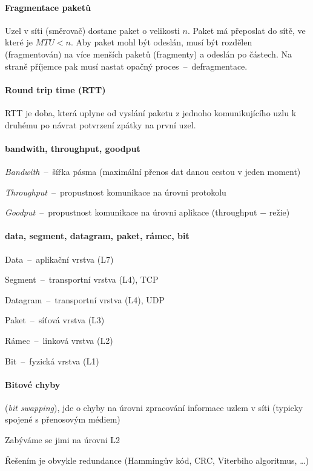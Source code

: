 \paragraph*{Fragmentace paketů} Uzel v síti (směrovač) dostane paket o velikosti $n$. Paket má přeposlat do sítě, ve které je $MTU < n$. Aby paket mohl být odeslán, musí být rozdělen (fragmentován) na více menších paketů (fragmenty) a odeslán po částech. Na straně příjemce pak musí nastat opačný proces~--~defragmentace.

\paragraph*{Round trip time (RTT)} RTT je doba, která uplyne od vyslání paketu z jednoho komunikujícího uzlu k druhému po návrat potvrzení zpátky na první uzel.

\paragraph*{bandwith, throughput, goodput} \begin{compactitem}
    \item \textit{Bandwith}~--~šířka pásma (maximální přenos dat danou cestou v jeden moment)
    \item \textit{Throughput}~--~propustnost komunikace na úrovni protokolu
    \item \textit{Goodput}~--~propustnost komunikace na úrovni aplikace (throughput $-$ režie)
\end{compactitem}

\paragraph*{data, segment, datagram, paket, rámec, bit} \begin{compactitem}
    \item Data~--~aplikační vrstva (L7)
    \item Segment~--~transportní vrstva (L4), TCP
    \item Datagram~--~transportní vrstva (L4), UDP
    \item Paket~--~síťová vrstva (L3)
    \item Rámec~--~linková vrstva (L2)
    \item Bit~--~fyzická vrstva (L1)
\end{compactitem}

\paragraph*{Bitové chyby} \begin{compactitem}
    \item {} (\textit{bit swapping}), jde o chyby na úrovni zpracování informace uzlem v síti (typicky spojené s přenosovým médiem)
    \item Zabýváme se jimi na úrovni L2
    \item Řešením je obvykle redundance (Hammingův kód, CRC, Viterbiho algoritmus, \dots)
\end{compactitem}

